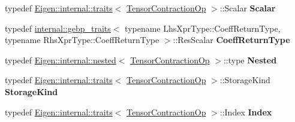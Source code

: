 \begin{DoxyCompactItemize}
typedef \hyperlink{struct_eigen_1_1internal_1_1traits}{Eigen\+::internal\+::traits}$<$ \hyperlink{class_eigen_1_1_tensor_contraction_op}{Tensor\+Contraction\+Op} $>$\+::Scalar {\bfseries Scalar}
\item 
\mbox{\label{class_eigen_1_1_tensor_contraction_op_aa23288e0007b2689605fbcb8aae1801e}} 
typedef \hyperlink{class_eigen_1_1internal_1_1gebp__traits}{internal\+::gebp\+\_\+traits}$<$ typename Lhs\+Xpr\+Type\+::\+Coeff\+Return\+Type, typename Rhs\+Xpr\+Type\+::\+Coeff\+Return\+Type $>$\+::Res\+Scalar {\bfseries Coeff\+Return\+Type}
\item 
\mbox{\label{class_eigen_1_1_tensor_contraction_op_a61f4957b7c6b0d31750d909d65e3bcde}} 
typedef \hyperlink{struct_eigen_1_1internal_1_1nested}{Eigen\+::internal\+::nested}$<$ \hyperlink{class_eigen_1_1_tensor_contraction_op}{Tensor\+Contraction\+Op} $>$\+::type {\bfseries Nested}
\item 
\mbox{\label{class_eigen_1_1_tensor_contraction_op_a6d21e364994b36ff1684f4ca4980c4fe}} 
typedef \hyperlink{struct_eigen_1_1internal_1_1traits}{Eigen\+::internal\+::traits}$<$ \hyperlink{class_eigen_1_1_tensor_contraction_op}{Tensor\+Contraction\+Op} $>$\+::Storage\+Kind {\bfseries Storage\+Kind}
\item 
\mbox{\label{class_eigen_1_1_tensor_contraction_op_a83eae7a702b928e780f93d13449215eb}} 
typedef \hyperlink{struct_eigen_1_1internal_1_1traits}{Eigen\+::internal\+::traits}$<$ \hyperlink{class_eigen_1_1_tensor_contraction_op}{Tensor\+Contraction\+Op} $>$\+::Index {\bfseries Index}
\end{DoxyCompactItemize}
